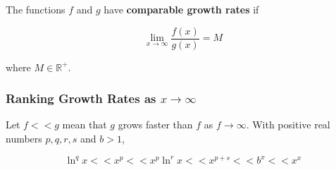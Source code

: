The functions $f$ and $g$ have \textbf{comparable growth rates} if

\begin{equation*}
    \lim _{x \rightarrow \infty} \frac{f(x)}{g(x)} = M
\end{equation*}

where $M \in \mathbb{R}^+.$

\subsubsection{Ranking Growth Rates as $x \rightarrow \infty$}
Let $f << g$ mean that $g$ grows faster than $f$ as $f \rightarrow \infty$. With positive real numbers $p, q, r, s$ and $b > 1$,

\begin{equation}
    \ln ^q x << x^p << x^p \ln ^r x << x ^{p + s} << b^x << x^x
\end{equation}
